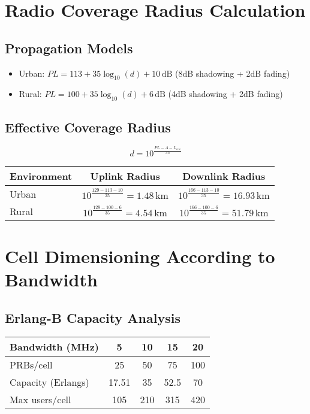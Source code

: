 \documentclass[a4paper,12pt]{article}
\begin{document}
\section{Radio Coverage Radius Calculation}

\subsection*{Propagation Models}
\begin{itemize}
    \item Urban: \( PL = 113 + 35\log_{10}(d) + 10\,\text{dB} \) (8dB shadowing + 2dB fading)
    \item Rural: \( PL = 100 + 35\log_{10}(d) + 6\,\text{dB} \) (4dB shadowing + 2dB fading)
\end{itemize}

\subsection*{Effective Coverage Radius}
\[
d = 10^{\frac{PL - A - L_{env}}{35}}
\]

\begin{center}
\begin{tabular}{lcc}
\toprule
Environment & Uplink Radius & Downlink Radius \\
\midrule
Urban & \( 10^{\frac{129-113-10}{35}} = 1.48\,\text{km} \) & \( 10^{\frac{166-113-10}{35}} = 16.93\,\text{km} \) \\
Rural & \( 10^{\frac{129-100-6}{35}} = 4.54\,\text{km} \) & \( 10^{\frac{166-100-6}{35}} = 51.79\,\text{km} \) \\
\bottomrule
\end{tabular}
\end{center}

\section{Cell Dimensioning According to Bandwidth}

\subsection*{Erlang-B Capacity Analysis}
\begin{center}
\begin{tabular}{lcccc}
\toprule
Bandwidth (MHz) & 5 & 10 & 15 & 20 \\
\midrule
PRBs/cell & 25 & 50 & 75 & 100 \\
Capacity (Erlangs) & 17.51 & 35 & 52.5 & 70 \\
Max users/cell & 105 & 210 & 315 & 420 \\
\bottomrule
\end{tabular}
\end{center}
\end{document}
